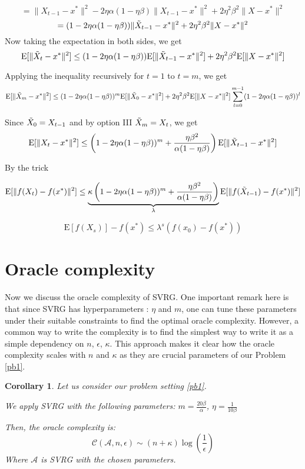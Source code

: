 \documentclass[12pt]{report}
\newtheorem{corollary}[lemma]{Corollary}
\newcounter{theo}[section]
\newcommand{\E}{\mathrm{E}}
\begin{document}
$$=\|{X}_{t-1}-x^*\|^2-2\eta\alpha(1-\eta\beta)\|{X}_{t-1}-x^*\|^2+2\eta^2\beta^2\|{X}-x^*\|^2$$
$$=(1-2\eta\alpha(1-\eta\beta))\|\Tilde{X}_{t-1}-x^* \|^2 +2\eta^2\beta^2\|X-x^* \|^2  $$
Now taking the expectation in both sides, we get
$$\E[ \|\Tilde{X}_t-x^*\|^2]\leq (1-2\eta\alpha(1-\eta\beta))\E[ \|\Tilde{X}_{t-1}-x^*\|^2]+ 2\eta^2\beta^2\E[\|X-x^* \|^2] $$

Applying the inequality recursively for $t=1$ to $t=m$, we get
$$\E[ \|\Tilde{X}_m-x^*\|^2]\leq (1-2\eta\alpha(1-\eta\beta))^m\E[ \|\Tilde{X}_{0}-x^*\|^2]+ 2\eta^2\beta^2\E[\|X-x^* \|^2]\sum\limits_{l=0}^{m-1}(1-2\eta\alpha(1-\eta\beta))^l  $$

Since $\Tilde{X}_0=X_{t-1}$ and by option III  $\Tilde{X}_m=X_{t}$, 
we get
$$\E[ \|X_{t}-x^*\|^2]\leq \left(1-2\eta\alpha(1-\eta\beta))^m+\frac{\eta\beta^2}{\alpha(1-\eta\beta)}\right)\E[ \|\Tilde{X}_{t-1}-x^*\|^2]  $$


By the trick


$$\E[ \|f(X_{t})-f(x^*)\|^2]\leq \underbrace{\kappa\left(1-2\eta\alpha(1-\eta\beta))^m+\frac{\eta\beta^2}{\alpha(1-\eta\beta)}\right)}_{\lambda}\E[ \|f(\Tilde{X}_{t-1})-f(x^*)\|^2]  $$

$$\E[f(X_{s})]-f(x^*)\leq \lambda^s(f(x_{0})-f(x^*))$$


\section{Oracle complexity}
Now we discuss the oracle complexity of SVRG. One important remark here is that since SVRG has hyperparameters : $\eta$ and $m$, one can tune these parameters under their suitable constraints to find the optimal oracle complexity. However, a common way to write the complexity is to find the simplest way to write it as a simple dependency on $n$, $\epsilon$, $\kappa$. This approach makes it clear how the oracle complexity scales with $n$ and $\kappa$ as they are crucial parameters of our Problem \ref{pb1}.
\begin{corollary}


Let us consider our problem setting \ref{pb1}.

We apply SVRG with the following parameters:
$m=\frac{20\beta}{\alpha}$,  $\eta=\frac{1}{10\beta}$

Then, the oracle complexity is:
$$ \mathcal{C}(\mathcal{A},n,\epsilon)\sim \left(n+\kappa \right)\log\left(\frac{1}{\epsilon}\right)$$
Where $\mathcal{A}$ is SVRG with the chosen parameters.
\end{corollary}
\end{document}
